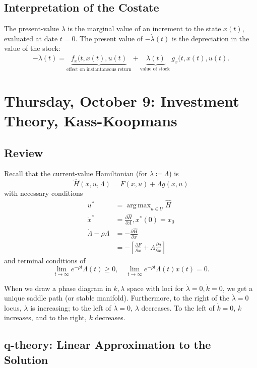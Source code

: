 \documentclass{tufte-handout}
\DeclareMathOperator*{\argmax}{arg\,max} %
\theoremstyle{definition}
\begin{document}
\subsection{Interpretation of the Costate}
The present-value $\lambda$ is the marginal value of an increment to the state $x\left( t \right)$, evaluated at date $t=0$. The present value of $-\dot{\lambda}(t)$ is the depreciation in the value of the stock: \[
-\dot{\lambda}(t) = \underbrace{f_x(t,x(t),u(t)}_{\text{effect on instantaneous return}} + \underbrace{\lambda(t)}_{\text{value of stock }} g_x(t, x(t),u(t)
.\] 

\section{Thursday, October 9: Investment Theory, Kass-Koopmans}
\subsection{Review}

Recall that the current-value Hamiltonian (for $\lambda \coloneqq \Lambda$) is \[
	\hat{H}(x, u, \Lambda) = F(x,u) + \Lambda g(x,u)
\] with necessary conditions 
\begin{align*}
	u^* &= \argmax_{u \in U} \hat{H} \\
	\dot{x}^* &= \frac{\partial \hat{H}}{\partial \Lambda}, x^*(0) = x_0 \\
	\dot{\Lambda} - \rho \Lambda &= -\frac{\partial \hat{H}}{\partial x}  \\
								 &= -\left[ \frac{\partial F}{\partial x} + \Lambda \frac{\partial g}{\partial x}  \right] 
\end{align*}
and terminal conditions of \[
	\lim\limits_{t \to \infty} e^{-\rho t} \Lambda(t) \ge 0, \quad \lim\limits_{t \to \infty} e^{-\rho t}\Lambda(t) x(t) = 0
.\] 


When we draw a phase diagram in $k, \lambda$ space with loci for $\dot{\lambda} = 0, \dot{k} = 0$, we get a unique saddle path (or stable manifold). Furthermore, to the right of the $\dot{\lambda} = 0$ locus, $\lambda$ is increasing; to the left of $\dot{\lambda} = 0$, $\lambda$ decreases. To the left of $\dot{k} = 0$, $k$ increases, and to the right, $k$ decreases. 

\subsection{q-theory: Linear Approximation to the Solution}
\end{document}
